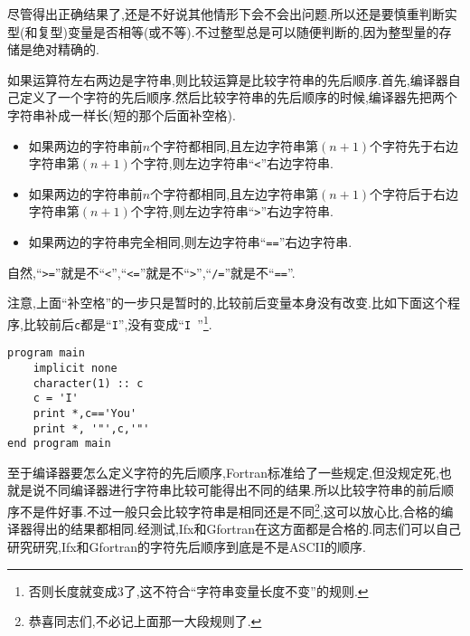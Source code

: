尽管得出正确结果了,还是不好说其他情形下会不会出问题.所以还是要慎重判断实型(和复型)变量是否相等(或不等).不过整型总是可以随便判断的,因为整型量的存储是绝对精确的.

如果运算符左右两边是字符串,则比较运算是比较字符串的先后顺序.首先,编译器自己定义了一个字符的先后顺序.然后比较字符串的先后顺序的时候,编译器先把两个字符串补成一样长(短的那个后面补空格).
\begin{itemize}
    \item 如果两边的字符串前$n$个字符都相同,且左边字符串第$(n+1)$个字符先于右边字符串第$(n+1)$个字符,则左边字符串``\texttt{<}''右边字符串.
    \item 如果两边的字符串前$n$个字符都相同,且左边字符串第$(n+1)$个字符后于右边字符串第$(n+1)$个字符,则左边字符串``\texttt{>}''右边字符串.
    \item 如果两边的字符串完全相同,则左边字符串``\texttt{==}''右边字符串.
\end{itemize}
自然,``\texttt{>=}''就是不``\texttt{<}'',``\texttt{<=}''就是不``\texttt{>}'',``\texttt{/=}''就是不``\texttt{==}''.

注意,上面``补空格''的一步只是暂时的,比较前后变量本身没有改变.比如下面这个程序,比较前后\texttt{c}都是``\texttt{I}'',没有变成``\texttt{I  }''\footnote{
否则长度就变成3了,这不符合``字符串变量长度不变''的规则.
}.
\begin{lstlisting}
program main
    implicit none
    character(1) :: c
    c = 'I'
    print *,c=='You'
    print *, '"',c,'"'
end program main
\end{lstlisting}

至于编译器要怎么定义字符的先后顺序,Fortran标准给了一些规定,但没规定死,也就是说不同编译器进行字符串比较可能得出不同的结果.所以比较字符串的前后顺序不是件好事.不过一般只会比较字符串是相同还是不同\footnote{
    恭喜同志们,不必记上面那一大段规则了.
},这可以放心比,合格的编译器得出的结果都相同.经测试,Ifx和Gfortran在这方面都是合格的.同志们可以自己研究研究,Ifx和Gfortran的字符先后顺序到底是不是ASCII的顺序.
